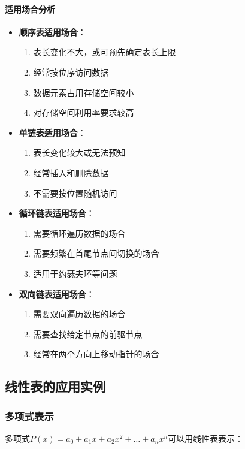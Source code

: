 \documentclass{../../note}
\begin{document}
\paragraph{适用场合分析}
\begin{itemize}
  \item \textbf{顺序表适用场合}：
    \begin{enumerate}
      \item 表长变化不大，或可预先确定表长上限
      \item 经常按位序访问数据
      \item 数据元素占用存储空间较小
      \item 对存储空间利用率要求较高
    \end{enumerate}
  \item \textbf{单链表适用场合}：
    \begin{enumerate}
      \item 表长变化较大或无法预知
      \item 经常插入和删除数据
      \item 不需要按位置随机访问
    \end{enumerate}
  \item \textbf{循环链表适用场合}：
    \begin{enumerate}
      \item 需要循环遍历数据的场合
      \item 需要频繁在首尾节点间切换的场合
      \item 适用于约瑟夫环等问题
    \end{enumerate}
  \item \textbf{双向链表适用场合}：
    \begin{enumerate}
      \item 需要双向遍历数据的场合
      \item 需要查找给定节点的前驱节点
      \item 经常在两个方向上移动指针的场合
    \end{enumerate}
\end{itemize}

\subsection{线性表的应用实例}

\subsubsection{多项式表示}

多项式$P(x) = a_0 + a_1x + a_2x^2 + \ldots + a_nx^n$可以用线性表表示：
\end{document}
